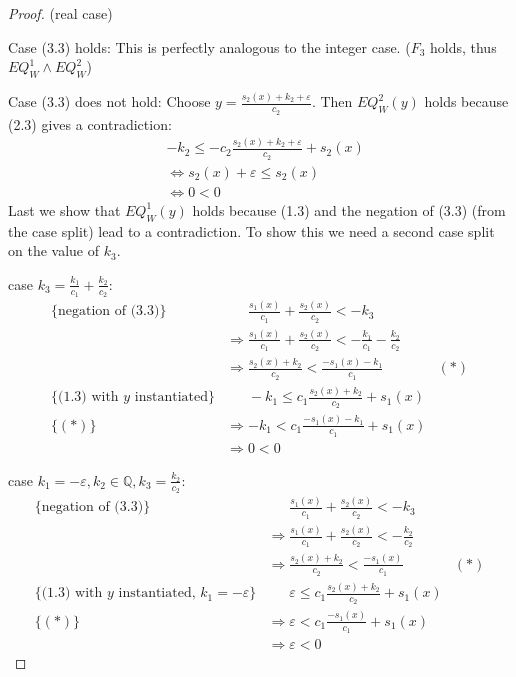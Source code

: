 \documentclass{llncs}
\begin{document}
\begin{proof}
(real case)

Case (3.3) holds: 
This is perfectly analogous to the integer case. ($F_3$ holds, thus $EQ^1_W \wedge EQ^2_W$)

Case (3.3) does not hold:
Choose $y = \frac{s_2(x)+k_2+\varepsilon}{c_2}.$
Then $EQ^2_W(y)$ holds because (2.3) gives a contradiction:
\begin{align*}
  & -k_2 \leq -c_2\frac{s_2(x)+k_2+\varepsilon}{c_2}+s_2(x) \\
  &\Leftrightarrow s_2(x)+\varepsilon \leq s_2(x) \\
  &\Leftrightarrow 0<0
\end{align*}
Last we show that $EQ^1_W(y)$ holds because (1.3) and the negation of (3.3) (from the case split)
lead to a contradiction. To show this we need a second case split on the value
of $k_3$.
  
case $k_3 = \frac{k_1}{c_1} + \frac{k_2}{c_2}$:
\begin{align*}
  \text{\{negation of (3.3)\}} & \phantom{\Rightarrow} \frac{s_1(x)}{c_1} + \frac{s_2(x)}{c_2} 
  < - k_3 \\
  & \Rightarrow \frac{s_1(x)}{c_1} + \frac{s_2(x)}{c_2} 
  < - \frac{k_1}{c_1} - \frac{k_2}{c_2} \\
  & \Rightarrow \frac{s_2(x)+k_2}{c_2} < \frac{-s_1(x)-k_1}{c_1} & (*) \\
  \text{\{(1.3) with $y$ instantiated\}} & 
  \phantom{\Rightarrow} -k_1 \leq c_1 \frac{s_2(x)+k_2}{c_2}  + s_1(x) \\
  \text{\{$(*)$\}} & 
  \Rightarrow -k_1 < c_1 \frac{-s_1(x)-k_1}{c_1} + s_1(x) \\
  &\Rightarrow 0<0
\end{align*}

case $k_1=-\varepsilon, k_2\in \mathbb{Q}, k_3 = \frac{k_2}{c_2}$:
\begin{align*}
  \text{\{negation of (3.3)\}} & \phantom{\Rightarrow} \frac{s_1(x)}{c_1} + \frac{s_2(x)}{c_2} 
  < - k_3 \\
  & \Rightarrow \frac{s_1(x)}{c_1} + \frac{s_2(x)}{c_2} 
  < - \frac{k_2}{c_2} \\
  & \Rightarrow \frac{s_2(x)+k_2}{c_2} < \frac{-s_1(x)}{c_1} & (*) \\
  \text{\{(1.3) with $y$ instantiated, $k_1=-\varepsilon$\}} & 
  \phantom{\Rightarrow} \varepsilon \leq c_1 \frac{s_2(x)+k_2}{c_2}  + s_1(x) \\
  \text{\{$(*)$\}} & 
  \Rightarrow \varepsilon < c_1 \frac{-s_1(x)}{c_1} + s_1(x) \\
  &\Rightarrow \varepsilon<0
\end{align*}


\end{proof}
\end{document}
